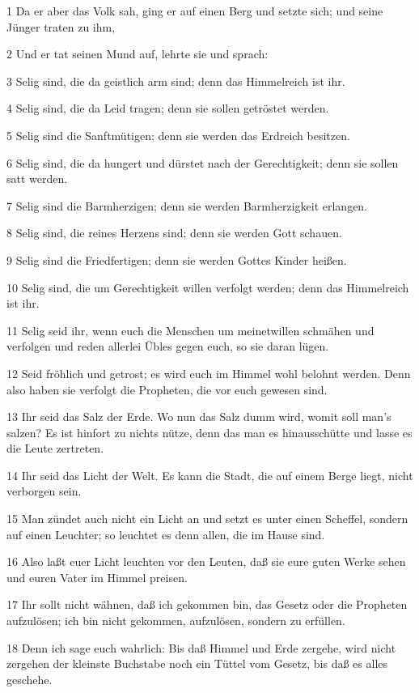 \par 1 Da er aber das Volk sah, ging er auf einen Berg und setzte sich; und seine Jünger traten zu ihm,
\par 2 Und er tat seinen Mund auf, lehrte sie und sprach:
\par 3 Selig sind, die da geistlich arm sind; denn das Himmelreich ist ihr.
\par 4 Selig sind, die da Leid tragen; denn sie sollen getröstet werden.
\par 5 Selig sind die Sanftmütigen; denn sie werden das Erdreich besitzen.
\par 6 Selig sind, die da hungert und dürstet nach der Gerechtigkeit; denn sie sollen satt werden.
\par 7 Selig sind die Barmherzigen; denn sie werden Barmherzigkeit erlangen.
\par 8 Selig sind, die reines Herzens sind; denn sie werden Gott schauen.
\par 9 Selig sind die Friedfertigen; denn sie werden Gottes Kinder heißen.
\par 10 Selig sind, die um Gerechtigkeit willen verfolgt werden; denn das Himmelreich ist ihr.
\par 11 Selig seid ihr, wenn euch die Menschen um meinetwillen schmähen und verfolgen und reden allerlei Übles gegen euch, so sie daran lügen.
\par 12 Seid fröhlich und getrost; es wird euch im Himmel wohl belohnt werden. Denn also haben sie verfolgt die Propheten, die vor euch gewesen sind.
\par 13 Ihr seid das Salz der Erde. Wo nun das Salz dumm wird, womit soll man's salzen? Es ist hinfort zu nichts nütze, denn das man es hinausschütte und lasse es die Leute zertreten.
\par 14 Ihr seid das Licht der Welt. Es kann die Stadt, die auf einem Berge liegt, nicht verborgen sein.
\par 15 Man zündet auch nicht ein Licht an und setzt es unter einen Scheffel, sondern auf einen Leuchter; so leuchtet es denn allen, die im Hause sind.
\par 16 Also laßt euer Licht leuchten vor den Leuten, daß sie eure guten Werke sehen und euren Vater im Himmel preisen.
\par 17 Ihr sollt nicht wähnen, daß ich gekommen bin, das Gesetz oder die Propheten aufzulösen; ich bin nicht gekommen, aufzulösen, sondern zu erfüllen.
\par 18 Denn ich sage euch wahrlich: Bis daß Himmel und Erde zergehe, wird nicht zergehen der kleinste Buchstabe noch ein Tüttel vom Gesetz, bis daß es alles geschehe.
